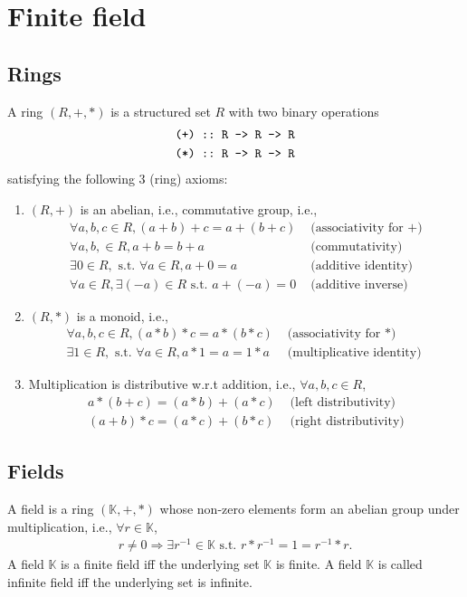 \documentclass[11pt]{book}
\begin{document}
\section{Finite field}

\subsection{Rings}
A ring $(R,+,*)$ is a structured set $R$ with two binary operations
\begin{eqnarray}
\verb|(+) :: R -> R -> R|\\
\verb|(*) :: R -> R -> R|
\end{eqnarray}
satisfying the following 3 (ring) axioms:
\begin{enumerate}
\item $(R,+)$ is an abelian, i.e., commutative group,
i.e.,
\begin{eqnarray}
\forall a,b,c \in R, (a+b) + c = a + (b + c) & \text{ (associativity for $+$)} \\
\forall a, b, \in R, a+b = b+a & \text{ (commutativity)} \\
\exists 0 \in R, \text{ s.t. } \forall a \in R, a + 0 = a & \text{ (additive identity) } \\
\forall a \in R, \exists (-a) \in R \text{ s.t. } a + (-a) = 0 & \text{ (additive inverse)}
\end{eqnarray}

\item $(R,*)$ is a monoid, i.e.,
\begin{eqnarray}
\forall a,b,c \in R, (a*b) * c = a * (b * c) & \text{ (associativity for $*$)} \\
\exists 1 \in R, \text{ s.t. } \forall a \in R, a * 1 = a = 1*a & \text{ (multiplicative identity) } 
\end{eqnarray}

\item Multiplication is distributive w.r.t addition, i.e., $\forall a,b,c \in R$, 
\begin{eqnarray}
a*(b+c) = (a*b) + (a*c) & \text{ (left distributivity)} \\
(a+b)*c = (a*c) + (b*c) & \text{ (right distributivity)} 
\end{eqnarray}

\end{enumerate}

\subsection{Fields}
A field is a ring $(\mathbb{K},+,*)$ whose non-zero elements form an abelian group under multiplication, i.e., $\forall r \in \mathbb{K}$,
\begin{eqnarray}
r \neq 0 \Rightarrow \exists r^{-1} \in \mathbb{K} \text{ s.t. } r*r^{-1} = 1 = r^{-1}*r.
\end{eqnarray}
A field $\mathbb{K}$ is a finite field iff the underlying set $\mathbb{K}$ is finite.
A field $\mathbb{K}$ is called infinite field iff the underlying set is infinite.
\end{document}
